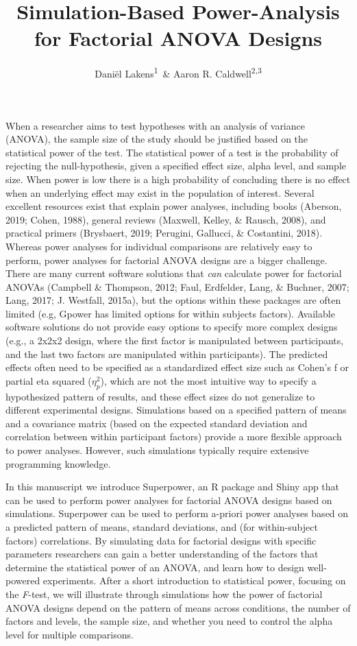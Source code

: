 \documentclass[
  ,man,floatsintext]{apa6}
\affiliation{
\vspace{0.5cm}
\textsuperscript{1} Human-Technology Interaction Group, Eindhoven University of Technology, The Netherlands\\\textsuperscript{2} Department of Health, Human Performance and Recreation, University of Arkansas, USA\\\textsuperscript{3} Thermal and Mountain Medicine Division, U.S. Army Research Institute of Environmental Medicine, USA}
\title{Simulation-Based Power-Analysis for Factorial ANOVA Designs}
\author{Daniël Lakens\textsuperscript{1}~\& Aaron R. Caldwell\textsuperscript{2,3}}
\date{}
\begin{document}
\maketitle

When a researcher aims to test hypotheses with an analysis of variance (ANOVA), the sample size of the study should be justified based on the statistical power of the test.
The statistical power of a test is the probability of rejecting the null-hypothesis, given a specified effect size, alpha level, and sample size.
When power is low there is a high probability of concluding there is no effect when an underlying effect may exist in the population of interest.
Several excellent resources exist that explain power analyses, including books (Aberson, 2019; Cohen, 1988), general reviews (Maxwell, Kelley, \& Rausch, 2008), and practical primers (Brysbaert, 2019; Perugini, Gallucci, \& Costantini, 2018).
Whereas power analyses for individual comparisons are relatively easy to perform, power analyses for factorial ANOVA designs are a bigger challenge. There are many current software solutions that \emph{can} calculate power for factorial ANOVAs (Campbell \& Thompson, 2012; Faul, Erdfelder, Lang, \& Buchner, 2007; Lang, 2017; J. Westfall, 2015a), but the options within these packages are often limited (e.g, Gpower has limited options for within subjects factors).
Available software solutions do not provide easy options to specify more complex designs (e.g., a 2x2x2 design, where the first factor is manipulated between participants, and the last two factors are manipulated within participants).
The predicted effects often need to be specified as a standardized effect size such as Cohen's f or partial eta squared (\(\eta_p^2\)), which are not the most intuitive way to specify a hypothesized pattern of results, and these effect sizes do not generalize to different experimental designs.
Simulations based on a specified pattern of means and a covariance matrix (based on the expected standard deviation and correlation between within participant factors) provide a more flexible approach to power analyses.
However, such simulations typically require extensive programming knowledge.

In this manuscript we introduce Superpower, an R package and Shiny app that can be used to perform power analyses for factorial ANOVA designs based on simulations.
Superpower can be used to perform a-priori power analyses based on a predicted pattern of means, standard deviations, and (for within-subject factors) correlations.
By simulating data for factorial designs with specific parameters researchers can gain a better understanding of the factors that determine the statistical power of an ANOVA, and learn how to design well-powered experiments.
After a short introduction to statistical power, focusing on the \emph{F}-test, we will illustrate through simulations how the power of factorial ANOVA designs depend on the pattern of means across conditions, the number of factors and levels, the sample size, and whether you need to control the alpha level for multiple comparisons.
\end{document}
